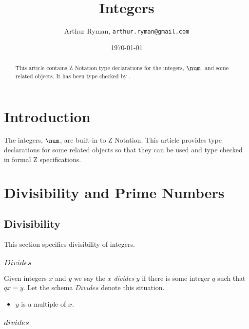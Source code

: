 \documentclass[11pt, oneside]{article}
\title{Integers}
\author{Arthur Ryman, {\tt arthur.ryman@gmail.com}}
\date{\today}
\begin{document}
\maketitle

\begin{abstract}
This article contains Z Notation type declarations for the integers, $\num$, and some related objects.
It has been type checked by \fuzz.
\end{abstract}

\tableofcontents

\section{Introduction}

The integers, $\num$, are built-in to Z Notation.
This article provides type declarations for some related objects so that they can be used and type checked in formal Z specifications.

\section{Divisibility and Prime Numbers}

\subsection{Divisibility}

This section specifies divisibility of integers.

\subsubsection{$Divides$}

Given integers $x$ and $y$ we say the $x$ \textit{divides} $y$ if there is some integer $q$ such 
that $q x = y$.
Let the schema $Divides$ denote this situation.

\begin{itemize}
	\item $y$ is a multiple of $x$.
\end{itemize}

\subsubsection{$divides$}
\end{document}
